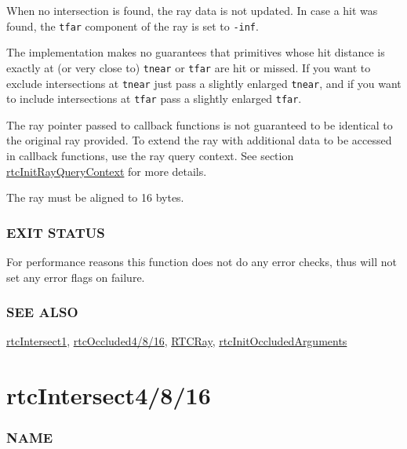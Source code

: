 When no intersection is found, the ray data is not updated. In case a
hit was found, the \texttt{tfar} component of the ray is set to
\texttt{-inf}.

The implementation makes no guarantees that primitives whose hit
distance is exactly at (or very close to) \texttt{tnear} or
\texttt{tfar} are hit or missed. If you want to exclude intersections at
\texttt{tnear} just pass a slightly enlarged \texttt{tnear}, and if you
want to include intersections at \texttt{tfar} pass a slightly enlarged
\texttt{tfar}.

The ray pointer passed to callback functions is not guaranteed to be
identical to the original ray provided. To extend the ray with
additional data to be accessed in callback functions, use the ray query
context. See section
\hyperref[rtcinitrayquerycontext]{rtcInitRayQueryContext} for more
details.

The ray must be aligned to 16 bytes.

\subsubsection{EXIT STATUS}\label{exit-status}

For performance reasons this function does not do any error checks, thus
will not set any error flags on failure.

\subsubsection{SEE ALSO}\label{see-also}

\hyperref[rtcintersect1]{rtcIntersect1},
\hyperref[rtcoccluded4816]{rtcOccluded4/8/16},
\hyperref[rtcray]{RTCRay},
\hyperref[rtcinitoccludedarguments]{rtcInitOccludedArguments}

\pagebreak

\section{rtcIntersect4/8/16}\label{rtcintersect4816}

\subsubsection{NAME}\label{name}

\begin{Shaded}
\begin{Highlighting}[]
\OperatorTok{/}\OperatorTok{/} \OperatorTok{{-}}
\end{Highlighting}
\end{Shaded}

